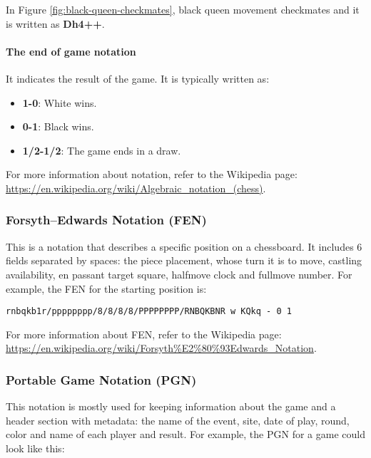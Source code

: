 In Figure \ref{fig:black-queen-checkmates}, black queen movement checkmates and it is written as \textbf{Dh4++}.

\paragraph{The end of game notation}
It indicates the result of the game. It is typically written as:

\begin{itemize}
    \item \textbf{1-0}: White wins.
    \item \textbf{0-1}: Black wins.
    \item \textbf{1/2-1/2}: The game ends in a draw.
\end{itemize}

For more information about notation, refer to the Wikipedia page: \url{https://en.wikipedia.org/wiki/Algebraic_notation_(chess)}.

\subsubsection{Forsyth–Edwards Notation (FEN)}

This is a notation that describes a specific position on a chessboard. It includes 6 fields separated by spaces: the piece placement, whose turn it is to move, castling availability, en passant target square, halfmove clock and fullmove number.
For example, the FEN for the starting position is:
\begin{verbatim}
rnbqkb1r/pppppppp/8/8/8/8/PPPPPPPP/RNBQKBNR w KQkq - 0 1
\end{verbatim}

\vspace{1em}

For more information about FEN, refer to the Wikipedia page: \url{https://en.wikipedia.org/wiki/Forsyth%E2%80%93Edwards_Notation}.

\subsubsection{Portable Game Notation (PGN)}

This notation is mostly used for keeping information about the game and a header section with metadata: the name of the event, site, date of play, round, color and name of each player and result. For example, the PGN for a game could look like this:

